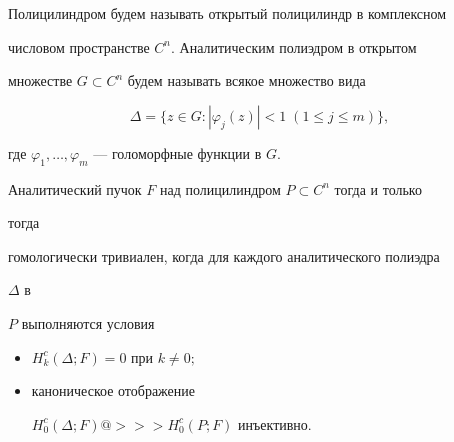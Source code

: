  


Полицилиндром будем называть открытый полицилиндр в комплексном 


числовом пространстве $C^n$. Аналитическим полиэдром в открытом 


множестве $G\subset C^n$ будем называть всякое множество вида 


$$ 


\Delta=\{z\in G:|\varphi_j(z)|<1\; (1\le j\le m)\}, 


$$ 


где $\varphi_1,\dotsc,\varphi_m$ --- голоморфные функции в $G$. 


 


\begin{lem} 


Аналитический пучок $F$ над полицилиндром $P\subset C^n$ тогда и только 


тогда 


гомологически тривиален, когда для каждого аналитического полиэдра 


$\Delta$ в 


$P$ выполняются условия 


\begin{itemize} 


\item[a)] $H^c_k(\Delta;F)=0$ при $k\ne 0;$ 


\item[б)] каноническое отображение 


$H^c_0(\Delta;F)@>>>H^c_0(P;F)$ инъективно. 


\end{itemize} 


\end{lem} 


 


